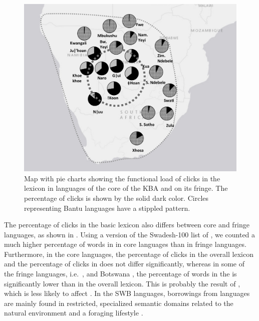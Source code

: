 \documentclass[output=paper,newtxmath,modfonts,nonflat,draftmode]{langsci/langscibook}
\begin{document}
\begin{figure}
\includegraphics[height=.35\textheight]{figures/sands-fig2.png}
\caption{Map with pie charts showing the functional load of clicks in the lexicon in languages of the core of the KBA and on its fringe. The percentage of clicks is shown by the solid dark color. Circles representing Bantu languages have a stippled pattern.}
\label{fig:sands:2}
\end{figure}

\largerpage
The percentage of clicks in the basic lexicon also differs between core and fringe languages, as shown in . Using a version of the Swadesh-100 list of  \citep{Holman2008}, we counted a much higher percentage of  words in  in core languages than in fringe languages. Furthermore, in the core languages, the percentage of clicks in the overall lexicon and the percentage of clicks in  does not differ significantly, whereas in some of the fringe languages, i.e.\ ,  and Botswana , the percentage of  words in the  is significantly lower than in the overall lexicon. This is probably the result of , which is less likely to affect . In the SWB languages, borrowings from  languages are mainly found in restricted, specialized semantic domains related to the natural environment and a foraging lifestyle \citep{Gunnink2015}. 
\end{document}
